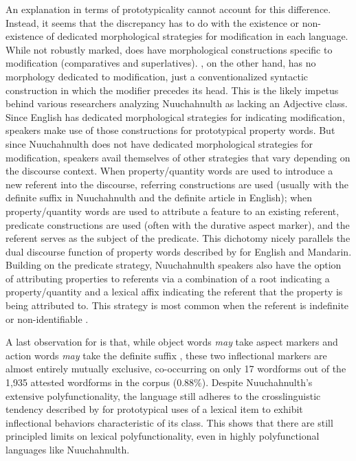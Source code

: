 An explanation in terms of prototypicality cannot account for this difference. Instead, it seems that the discrepancy has to do with the existence or non-existence of dedicated morphological strategies for modification in each language. While not robustly marked,  does have morphological constructions specific to modification (comparatives and superlatives). , on the other hand, has no morphology dedicated to modification, just a conventionalized syntactic construction in which the modifier precedes its head. This is the likely impetus behind various researchers analyzing Nuuchahnulth as lacking an Adjective class. Since English has dedicated morphological strategies for indicating modification, speakers make use of those constructions for prototypical property words. But since Nuuchahnulth does not have dedicated morphological strategies for modification, speakers avail themselves of other strategies that vary depending on the discourse context. When property/quantity words are used to introduce a new referent into the discourse, referring constructions are used (usually with the definite suffix  in Nuuchahnulth and the definite article in English); when property/quantity words are used to attribute a feature to an existing referent, predicate constructions are used (often with the durative aspect marker), and the referent serves as the subject of the predicate. This dichotomy nicely parallels the dual discourse function of property words described by \textcite{Thompson1989} for English and Mandarin. Building on the predicate strategy, Nuuchahnulth speakers also have the option of attributing properties to referents via a combination of a root indicating a property/quantity and a lexical affix indicating the referent that the property is being attributed to. This strategy is most common when the referent is indefinite or non-identifiable \parencite[144]{Nakayama2001}.

A last observation for  is that, while object words \emph{may} take aspect markers and action words \emph{may} take the definite suffix , these two inflectional markers are almost entirely mutually exclusive, co-occurring on only 17 wordforms out of the 1,935 attested wordforms in the corpus (0.88\%). Despite Nuuchahnulth's extensive polyfunctionality, the language still adheres to the crosslinguistic tendency described by \textcite{HopperThompson1984} for prototypical uses of a lexical item to exhibit inflectional behaviors characteristic of its class. This shows that there are still principled limits on lexical polyfunctionality, even in highly polyfunctional languages like Nuuchahnulth.

